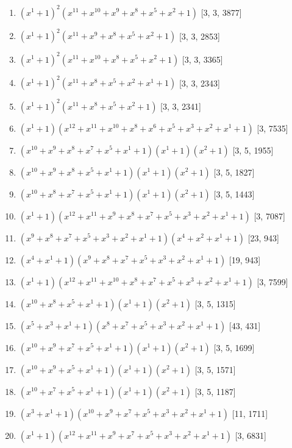 \documentclass[10pt,twocolumn]{article}
\begin{document}
\begin{enumerate}
\item $(x^{1} + 1)^{2}(x^{11} + x^{10} + x^{9} + x^{8} + x^{5} + x^{2} + 1)$  [3, 3, 3877]
\item $(x^{1} + 1)^{2}(x^{11} + x^{9} + x^{8} + x^{5} + x^{2} + 1)$  [3, 3, 2853]
\item $(x^{1} + 1)^{2}(x^{11} + x^{10} + x^{8} + x^{5} + x^{2} + 1)$  [3, 3, 3365]
\item $(x^{1} + 1)^{2}(x^{11} + x^{8} + x^{5} + x^{2} + x^{1} + 1)$  [3, 3, 2343]
\item $(x^{1} + 1)^{2}(x^{11} + x^{8} + x^{5} + x^{2} + 1)$  [3, 3, 2341]
\item $(x^{1} + 1)(x^{12} + x^{11} + x^{10} + x^{8} + x^{6} + x^{5} + x^{3} + x^{2} + x^{1} + 1)$  [3, 7535]
\item $(x^{10} + x^{9} + x^{8} + x^{7} + x^{5} + x^{1} + 1)(x^{1} + 1)(x^{2} + 1)$  [3, 5, 1955]
\item $(x^{10} + x^{9} + x^{8} + x^{5} + x^{1} + 1)(x^{1} + 1)(x^{2} + 1)$  [3, 5, 1827]
\item $(x^{10} + x^{8} + x^{7} + x^{5} + x^{1} + 1)(x^{1} + 1)(x^{2} + 1)$  [3, 5, 1443]
\item $(x^{1} + 1)(x^{12} + x^{11} + x^{9} + x^{8} + x^{7} + x^{5} + x^{3} + x^{2} + x^{1} + 1)$  [3, 7087]
\item $(x^{9} + x^{8} + x^{7} + x^{5} + x^{3} + x^{2} + x^{1} + 1)(x^{4} + x^{2} + x^{1} + 1)$  [23, 943]
\item $(x^{4} + x^{1} + 1)(x^{9} + x^{8} + x^{7} + x^{5} + x^{3} + x^{2} + x^{1} + 1)$  [19, 943]
\item $(x^{1} + 1)(x^{12} + x^{11} + x^{10} + x^{8} + x^{7} + x^{5} + x^{3} + x^{2} + x^{1} + 1)$  [3, 7599]
\item $(x^{10} + x^{8} + x^{5} + x^{1} + 1)(x^{1} + 1)(x^{2} + 1)$  [3, 5, 1315]
\item $(x^{5} + x^{3} + x^{1} + 1)(x^{8} + x^{7} + x^{5} + x^{3} + x^{2} + x^{1} + 1)$  [43, 431]
\item $(x^{10} + x^{9} + x^{7} + x^{5} + x^{1} + 1)(x^{1} + 1)(x^{2} + 1)$  [3, 5, 1699]
\item $(x^{10} + x^{9} + x^{5} + x^{1} + 1)(x^{1} + 1)(x^{2} + 1)$  [3, 5, 1571]
\item $(x^{10} + x^{7} + x^{5} + x^{1} + 1)(x^{1} + 1)(x^{2} + 1)$  [3, 5, 1187]
\item $(x^{3} + x^{1} + 1)(x^{10} + x^{9} + x^{7} + x^{5} + x^{3} + x^{2} + x^{1} + 1)$  [11, 1711]
\item $(x^{1} + 1)(x^{12} + x^{11} + x^{9} + x^{7} + x^{5} + x^{3} + x^{2} + x^{1} + 1)$  [3, 6831]

\end{enumerate}
\end{document}
